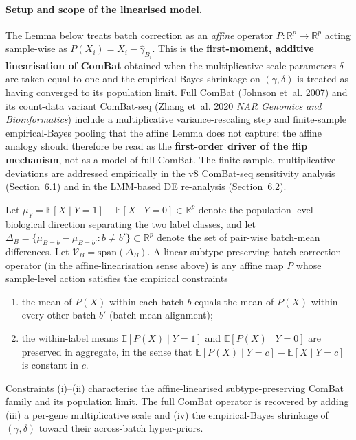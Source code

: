 \documentclass[11pt,a4paper]{article}
\begin{document}
\paragraph{Setup and scope of the linearised model.}
The Lemma below treats batch correction as an \emph{affine} operator
$P : \mathbb{R}^{p} \to \mathbb{R}^{p}$ acting sample-wise as
$P(X_i) = X_i - \hat\gamma_{B_i}$. This is the \textbf{first-moment, additive
linearisation of ComBat} obtained when the multiplicative scale parameters
$\delta$ are taken equal to one and the empirical-Bayes shrinkage on
$(\gamma, \delta)$ is treated as having converged to its population limit.
Full ComBat (Johnson et~al. 2007) and its count-data variant ComBat-seq
(Zhang et~al. 2020 \emph{NAR Genomics and Bioinformatics}) include a
multiplicative variance-rescaling step and finite-sample empirical-Bayes
pooling that the affine Lemma does not capture; the affine analogy
should therefore be read as the \textbf{first-order driver of the
flip mechanism}, not as a model of full ComBat. The
finite-sample, multiplicative deviations are addressed empirically in
the v8 ComBat-seq sensitivity analysis (Section~6.1) and in the
LMM-based DE re-analysis (Section~6.2).

Let $\mu_Y = \mathbb{E}[X \mid Y=1] - \mathbb{E}[X \mid Y=0]
\in \mathbb{R}^{p}$ denote the population-level biological direction
separating the two label classes, and let $\Delta_B = \{\mu_{B=b} -
\mu_{B=b'} : b \ne b'\} \subset \mathbb{R}^{p}$ denote the set of
pair-wise batch-mean differences. Let
$\mathcal{V}_B = \mathrm{span}(\Delta_B)$. A linear subtype-preserving
batch-correction operator (in the affine-linearisation sense above) is
any affine map $P$ whose sample-level action satisfies the empirical
constraints
\begin{enumerate}
  \item[(i)] the mean of $P(X)$ within each batch $b$ equals the mean of
   $P(X)$ within every other batch $b'$ (batch mean alignment);
  \item[(ii)] the within-label means $\mathbb{E}[P(X) \mid Y=1]$ and
   $\mathbb{E}[P(X) \mid Y=0]$ are preserved in aggregate, in the sense
   that $\mathbb{E}[P(X) \mid Y=c] - \mathbb{E}[X \mid Y=c]$ is constant in
   $c$.
\end{enumerate}
Constraints (i)--(ii) characterise the affine-linearised
subtype-preserving ComBat family and its population limit. The full
ComBat operator is recovered by adding (iii) a per-gene multiplicative
scale and (iv) the empirical-Bayes shrinkage of $(\gamma, \delta)$ toward
their across-batch hyper-priors.
\end{document}
